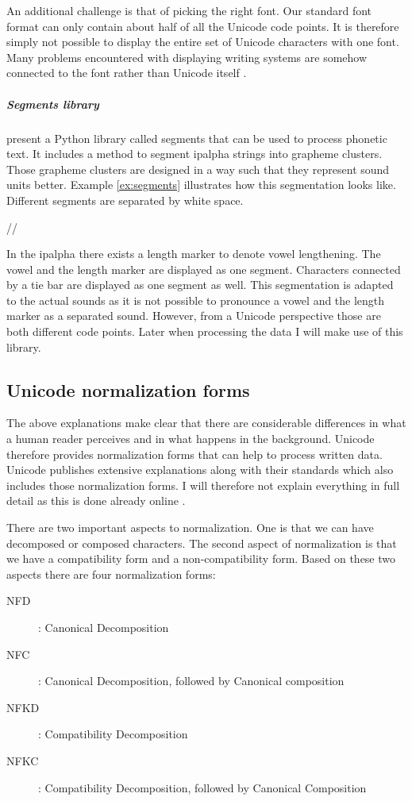 An additional challenge is that of picking the right font. Our standard font format can only contain about half of all the Unicode code points. It is therefore simply not possible to display the entire set of Unicode characters with one font. Many problems encountered with displaying writing systems are somehow connected to the font rather than Unicode itself \citep{unicode-lingu}.

\subparagraph{Segments library} \citet{unicode-lingu} present a Python library called segments that can be used to process phonetic text. It includes a method to segment \ac{ipalpha} strings into grapheme clusters. Those grapheme clusters are designed in a way such that they represent sound units better. Example \ref{ex:segments} illustrates how this segmentation looks like. Different segments are separated by white space.

\begin{covexamples}
\label{ex:segments}
\item //
\end{covexamples}

In the \ac{ipalpha} there exists a length marker to denote vowel lengthening. The vowel and the length marker are displayed as one segment. Characters connected by a tie bar are displayed as one segment as well. This segmentation is adapted to the actual sounds as it is not possible to pronounce a vowel and the length marker as a separated sound. However, from a Unicode perspective those are both different code points. Later when processing the data I will make use of this library.

\subsection*{Unicode normalization forms}
The above explanations make clear that there are considerable differences in what a human reader perceives and in what happens in the background. Unicode therefore provides normalization forms that can help to process written data. Unicode publishes extensive explanations along with their standards which also includes those normalization forms. I will therefore not explain everything in full detail as this is done already online . 

There are two important aspects to normalization. One is that we can have decomposed or composed characters. The second aspect of normalization is that we have a compatibility form and a non-compatibility form. Based on these two aspects there are four normalization forms:
\begin{description}
\item[NFD] : Canonical Decomposition
\item[NFC] : Canonical Decomposition, followed by Canonical composition
\item[NFKD] : Compatibility Decomposition
\item[NFKC] : Compatibility Decomposition, followed by Canonical Composition
\end{description}

